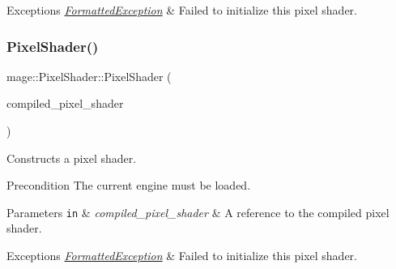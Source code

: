 \begin{DoxyExceptions}{Exceptions}
{\em \hyperlink{structmage_1_1_formatted_exception}{Formatted\+Exception}} & Failed to initialize this pixel shader. \\
\hline
\end{DoxyExceptions}
\hypertarget{classmage_1_1_pixel_shader_a1e283883bbdba3dbff22c0acda0b2473}{}\label{classmage_1_1_pixel_shader_a1e283883bbdba3dbff22c0acda0b2473} 
\subsubsection{\texorpdfstring{Pixel\+Shader()}{PixelShader()}\hspace{0.1cm}{\footnotesize\ttfamily [3/6]}}
{\footnotesize\ttfamily mage\+::\+Pixel\+Shader\+::\+Pixel\+Shader (\begin{DoxyParamCaption}\item[{const \hyperlink{structmage_1_1_compiled_pixel_shader}{Compiled\+Pixel\+Shader} \&}]{compiled\+\_\+pixel\+\_\+shader }\end{DoxyParamCaption})\hspace{0.3cm}{\ttfamily [explicit]}}

Constructs a pixel shader.

\begin{DoxyPrecond}{Precondition}
The current engine must be loaded. 
\end{DoxyPrecond}

\begin{DoxyParams}[1]{Parameters}
\mbox{\tt in}  & {\em compiled\+\_\+pixel\+\_\+shader} & A reference to the compiled pixel shader. \\
\hline
\end{DoxyParams}

\begin{DoxyExceptions}{Exceptions}
{\em \hyperlink{structmage_1_1_formatted_exception}{Formatted\+Exception}} & Failed to initialize this pixel shader. \\
\hline
\end{DoxyExceptions}
\hypertarget{classmage_1_1_pixel_shader_a6d3bef6c6d0e2b20443eed92788646e2}{}\label{classmage_1_1_pixel_shader_a6d3bef6c6d0e2b20443eed92788646e2} 
